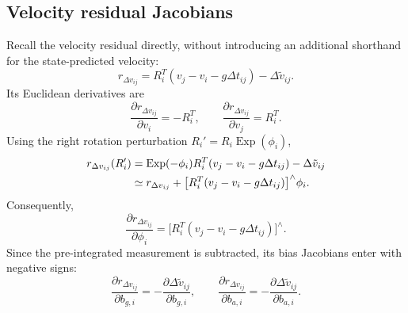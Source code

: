 \documentclass[11pt,a4paper]{article}
\newcommand{\Exp}{\operatorname{Exp}}
\begin{document}
\subsection{Velocity residual Jacobians}
Recall the velocity residual directly, without introducing an
additional shorthand for the state-predicted velocity:
\begin{equation}
r_{\Delta v_{ij}}=R_i^T(v_j-v_i-g\Delta t_{ij})-\Delta\tilde v_{ij}.
\end{equation}
Its Euclidean derivatives are
\begin{equation}
\boxed{\frac{\partial r_{\Delta v_{ij}}}{\partial v_i}=-R_i^T,
\qquad\frac{\partial r_{\Delta v_{ij}}}{\partial v_j}=R_i^T.}
\end{equation}
Using the right rotation perturbation $R_i'=R_i\Exp(\phi_i)$,
\begin{align}
r_{\Delta v_{ij}}(R_i')
&=\Exp(-\phi_i)R_i^T(v_j-v_i-g\Delta t_{ij})
-\Delta\tilde v_{ij}\notag\\
&\simeq r_{\Delta v_{ij}}+
\bigl[R_i^T(v_j-v_i-g\Delta t_{ij})\bigr]^\wedge\phi_i.
\end{align}
Consequently,
\begin{equation}\label{eq:JresVphi}
\boxed{\frac{\partial r_{\Delta v_{ij}}}{\partial\phi_i}
=\bigl[R_i^T(v_j-v_i-g\Delta t_{ij})\bigr]^\wedge.}
\end{equation}
Since the pre-integrated measurement is subtracted, its bias
Jacobians enter with negative signs:
\begin{equation}
\frac{\partial r_{\Delta v_{ij}}}{\partial b_{g,i}}
=-\frac{\partial\Delta\tilde v_{ij}}{\partial b_{g,i}},\qquad
\frac{\partial r_{\Delta v_{ij}}}{\partial b_{a,i}}
=-\frac{\partial\Delta\tilde v_{ij}}{\partial b_{a,i}}.
\end{equation}
\end{document}
